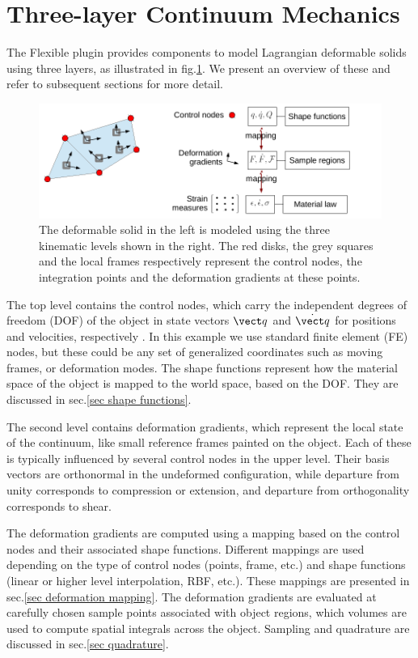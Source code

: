 \section{Three-layer Continuum Mechanics}
The Flexible plugin provides components to model Lagrangian deformable solids using three layers, as illustrated in fig.\ref{fig tree levels}.
We present an overview of these and refer to subsequent sections for more detail.
\begin{figure}
 \centering
 \includegraphics[height=0.3\linewidth]{threeLevels.pdf}
 \caption{The deformable solid in the left is modeled using the three kinematic levels shown in the right.
 The red disks, the grey squares and the local frames respectively represent the control nodes, the integration points and the deformation gradients at these points.
 }\label{fig tree levels}
\end{figure}

The top level contains the control nodes, which carry the independent degrees of freedom (DOF) of the object in state vectors $\vect \dof$ 
and $\dot{\vect\dof}$ for positions and velocities, respectively . 
In this example we use standard finite element (FE) nodes, but these could be any set of generalized coordinates such as moving frames, or deformation modes.
The shape functions represent how the material space of the object is mapped to the world space, based on the DOF. They are discussed in sec.\ref{sec shape functions}.

The second level contains deformation gradients, which represent the local state of the continuum, like small reference frames painted on the object.
Each of these is typically influenced by several control nodes in the upper level.
Their basis vectors are orthonormal in the undeformed configuration, while departure from unity corresponds to compression or extension, and departure from orthogonality corresponds to shear.

The deformation gradients are computed using a mapping based on the control nodes and their associated shape functions.
Different mappings are used depending on the type of control nodes (points, frame, etc.) and shape functions (linear or higher level interpolation, RBF, etc.). These mappings are presented in sec.\ref{sec deformation mapping}.
The deformation gradients are evaluated at carefully chosen sample points associated with object regions, which volumes are used to compute spatial integrals across the object. Sampling and quadrature are discussed in sec.\ref{sec quadrature}.

